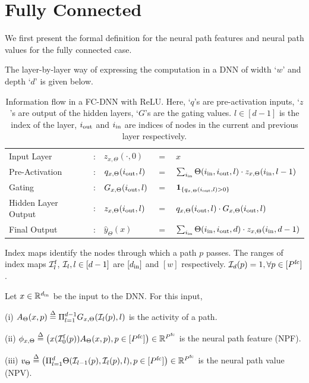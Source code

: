 \section{Fully Connected}
We first present the formal definition for the neural path features and neural path values for the fully connected case. 

The layer-by-layer way of expressing the computation in a DNN of width `$w$' and depth `$d$' is given below.
\begin{table}[h]
\centering
\begin{tabular}{| ll lll|}\hline
 Input Layer &:& $z_{x,\Theta}(\cdot,0)$ &$=$ &$x$ \\
Pre-Activation&:& $q_{x,\Theta}(i_{\text{out}},l)$& $=$ & $\sum_{i_{\text{in}}}\Theta(i_{\text{in}},i_{\text{out}},l) \cdot z_{x,\Theta}(i_{\text{in}},l-1) $\\
Gating&:& $G_{x,\Theta}(i_{\text{out}},l)$& $=$ & $\mathbf{1}_{\{q_{x,\Theta}(i_{\text{out}},l)>0\}}$\\
Hidden Layer Output &:&$z_{x,\Theta}(i_{\text{out}},l)$ & $=$ & $q_{x,\Theta}(i_{\text{out}},l)\cdot G_{x,\Theta}(i_{\text{out}},l)$\\
Final Output &:&$\hat{y}_{\Theta}(x)$ & $=$ & $\sum_{i_{\text{in}}}\Theta(i_{\text{in}},i_{\text{out}}, d)\cdot z_{x,\Theta}(i_{\text{in}},d-1)$\\\hline
\end{tabular}
\caption{\small{Information flow in a FC-DNN with ReLU. Here, `$q$'s are pre-activation inputs, `$z$'s are output of the hidden layers, `$G$'s are the gating values. $l\in[d-1]$ is the index of the layer, $i_{\text{out}}$ and $i_{\text{in}}$ are indices of  nodes in the current and previous layer respectively.}}
\label{tb:basic}
\end{table}

\begin{notation}
Index maps identify the nodes through which a path $p$ passes. The ranges of index maps $\mathcal{I}^{\text{f}}_l$, $\mathcal{I}_l,l\in[d-1]$ are $[d_{\text{in}}]$ and $[w]$ respectively.  $\mathcal{I}_d(p)=1,\forall p\in[P^{\text{fc}}]$.
\end{notation}

\begin{definition} Let $x\in\mathbb{R}^{d_{\text{in}}}$ be the input to the DNN. For this input, 

(i)  $A_{\Theta}(x,p)\stackrel{\Delta}{=}\Pi_{l=1}^{d-1} G_{x,\Theta}(\mathcal{I}_l(p),l)$ is the activity of a path.

(ii)  $\phi_{x,\Theta}\stackrel{\Delta}{=} \left( x(\mathcal{I}^{\text{f}}_0(p))A_{\Theta}(x,p), p\in[P^{\text{fc}}]\right)\in\mathbb{R}^{P^{\text{fc}}}$ is the {neural path feature} (NPF).

(iii)  $v_{\Theta}\stackrel{\Delta}{=} \left( \Pi_{l=1}^d \Theta(\mathcal{I}_{l-1}(p),\mathcal{I}_l(p),l), p\in[P^{\text{fc}}]\right)\in\mathbb{R}^{P^{\text{fc}}}$ is the {neural path value} (NPV).
\end{definition}

